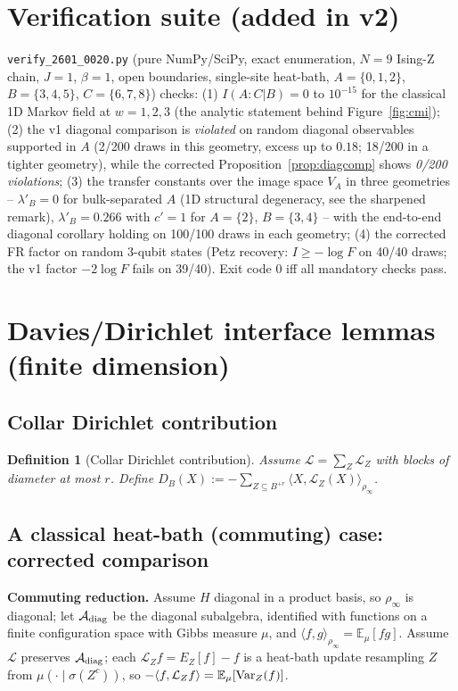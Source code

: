 \documentclass[11pt]{article}
\newtheorem{definition}[theorem]{Definition}
\theoremstyle{remark}
\begin{document}
\section{Verification suite (added in v2)}
\label{sec:verif}
\texttt{verify\_2601\_0020.py} (pure NumPy/SciPy, exact enumeration,
$N = 9$ Ising-Z chain, $J = 1$, $\beta = 1$, open boundaries, single-site
heat-bath, $A = \{0,1,2\}$, $B = \{3,4,5\}$, $C = \{6,7,8\}$) checks:
(1) $I(A:C|B) = 0$ to $10^{-15}$ for the classical 1D Markov field at
$w = 1, 2, 3$ (the analytic statement behind Figure~\ref{fig:cmi});
(2) the v1 diagonal comparison is \emph{violated} on random diagonal
observables supported in $A$ (2/200 draws in this geometry, excess up to
$0.18$; 18/200 in a tighter geometry), while the corrected
Proposition~\ref{prop:diagcomp} shows \emph{0/200 violations};
(3) the transfer constants over the image space $V_A$ in three
geometries -- $\lambda'_B = 0$ for bulk-separated $A$ (1D structural
degeneracy, see the sharpened remark), $\lambda'_B = 0.266$ with
$c' = 1$ for $A = \{2\}$, $B = \{3,4\}$ -- with the end-to-end diagonal
corollary holding on 100/100 draws in each geometry;
(4) the corrected FR factor on random 3-qubit states (Petz recovery:
$I \ge -\log F$ on 40/40 draws; the v1 factor $-2\log F$ fails on 39/40).
Exit code 0 iff all mandatory checks pass.

\appendix
\section{Davies/Dirichlet interface lemmas (finite dimension)}

\subsection{Collar Dirichlet contribution}
\begin{definition}[Collar Dirichlet contribution]
\label{def:collar}
Assume $\mathcal{L} = \sum_Z \mathcal{L}_Z$ with blocks of diameter at most
$r$. Define $D_B(X) := -\sum_{Z \subseteq B^{+r}} \langle X,
\mathcal{L}_Z(X)\rangle_{\rho_\infty}$.
\end{definition}

\subsection{A classical heat-bath (commuting) case: corrected comparison}
\textbf{Commuting reduction.} Assume $H$ diagonal in a product basis, so
$\rho_\infty$ is diagonal; let $\mathcal{A}_{\rm diag}$ be the diagonal
subalgebra, identified with functions on a finite configuration space with
Gibbs measure $\mu$, and $\langle f, g\rangle_{\rho_\infty} =
\mathbb{E}_\mu[fg]$. Assume $\mathcal{L}$ preserves
$\mathcal{A}_{\rm diag}$; each $\mathcal{L}_Z f = E_Z[f] - f$ is a
heat-bath update resampling $Z$ from $\mu(\cdot \mid \sigma(Z^c))$, so
$-\langle f, \mathcal{L}_Z f\rangle = \mathbb{E}_\mu[{\rm Var}_Z(f)]$.
\end{document}
